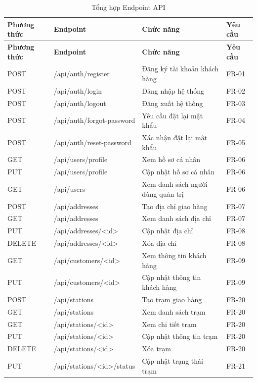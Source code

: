 \begin{longtable}{|p{2.2cm}|p{5.5cm}|p{5cm}|p{1.8cm}|}
\caption{Tổng hợp Endpoint API}
\label{tab:api-endpoints}\\
\hline
\textbf{Phương thức} & \textbf{Endpoint} & \textbf{Chức năng} & \textbf{Yêu cầu} \\
\hline
\endfirsthead
\hline
\textbf{Phương thức} & \textbf{Endpoint} & \textbf{Chức năng} & \textbf{Yêu cầu} \\
\hline
\endhead

POST & /api/auth/register & Đăng ký tài khoản khách hàng & FR-01 \\
\hline
POST & /api/auth/login & Đăng nhập hệ thống & FR-02 \\
\hline
POST & /api/auth/logout & Đăng xuất hệ thống & FR-03 \\
\hline
POST & /api/auth/forgot-password & Yêu cầu đặt lại mật khẩu & FR-04 \\
\hline
POST & /api/auth/reset-password & Xác nhận đặt lại mật khẩu & FR-05 \\
\hline
GET & /api/users/profile & Xem hồ sơ cá nhân & FR-06 \\
\hline
PUT & /api/users/profile & Cập nhật hồ sơ cá nhân & FR-06 \\
\hline
GET & /api/users & Xem danh sách người dùng quản trị & FR-06 \\
\hline
POST & /api/addresses & Tạo địa chỉ giao hàng & FR-07 \\
\hline
GET & /api/addresses & Xem danh sách địa chỉ & FR-07 \\
\hline
PUT & /api/addresses/<id> & Cập nhật địa chỉ & FR-08 \\
\hline
DELETE & /api/addresses/<id> & Xóa địa chỉ & FR-08 \\
\hline
GET & /api/customers/<id> & Xem thông tin khách hàng & FR-09 \\
\hline
PUT & /api/customers/<id> & Cập nhật thông tin khách hàng & FR-09 \\
\hline
POST & /api/stations & Tạo trạm giao hàng & FR-20 \\
\hline
GET & /api/stations & Xem danh sách trạm & FR-20 \\
\hline
GET & /api/stations/<id> & Xem chi tiết trạm & FR-20 \\
\hline
PUT & /api/stations/<id> & Cập nhật thông tin trạm & FR-20 \\
\hline
DELETE & /api/stations/<id> & Xóa trạm & FR-20 \\
\hline
PUT & /api/stations/<id>/status & Cập nhật trạng thái trạm & FR-21 \\

\end{longtable}
